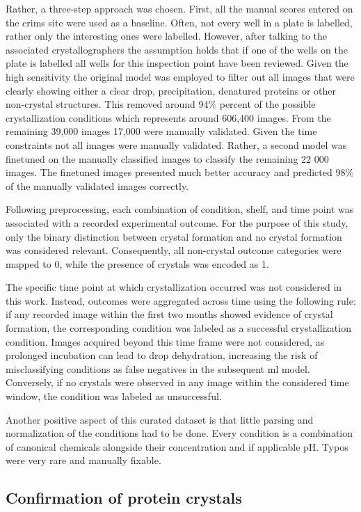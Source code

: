 Rather, a three-step approach was chosen. First, all the manual scores entered on the \gls{crims} site were used as a baseline. Often, not every well in a plate is labelled, rather only the interesting ones were labelled. However, after talking to the associated crystallographers the assumption holds that if one of the wells on the plate is labelled all wells for this inspection point have been reviewed. Given the high sensitivity the original model was employed to filter out all images that were clearly showing either a clear drop, precipitation, denatured proteins or other non-crystal structures. This removed around 94\% percent of the possible crystallization conditions which represents around 606,400 images. From the remaining 39,000 images 17,000 were manually validated. Given the time constraints not all images were manually validated. Rather, a second model was finetuned on the manually classified images to classify the remaining 22 000 images. The finetuned images presented much better accuracy and predicted 98\% of the manually validated images correctly. 

Following preprocessing, each combination of condition, shelf, and time point was associated with a recorded experimental outcome. For the purpose of this study, only the binary distinction between crystal formation and no crystal formation was considered relevant. Consequently, all non-crystal outcome categories were mapped to 0, while the presence of crystals was encoded as 1.

The specific time point at which crystallization occurred was not considered in this work. Instead, outcomes were aggregated across time using the following rule: if any recorded image within the first two months showed evidence of crystal formation, the corresponding condition was labeled as a successful crystallization condition. Images acquired beyond this time frame were not considered, as prolonged incubation can lead to drop dehydration, increasing the risk of misclassifying conditions as false negatives in the subsequent \gls{ml} model. Conversely, if no crystals were observed in any image within the considered time window, the condition was labeled as unsuccessful.

Another positive aspect of this curated dataset is that little parsing and normalization of the conditions had to be done. Every condition is a combination of canonical chemicals alongside their concentration and if applicable pH. Typos were very rare and manually fixable. 

\subsection{Confirmation of protein crystals}\label{sec:crims/confirmation_protein_crystals}

